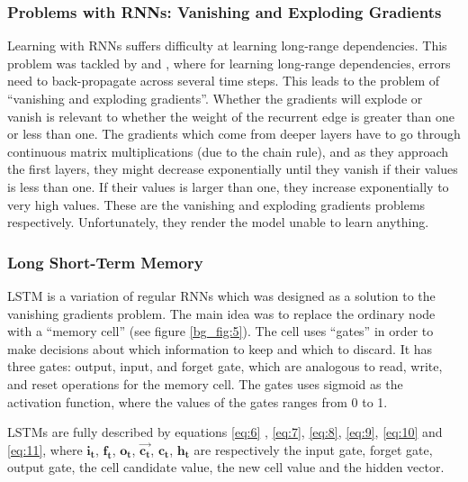 
\subsubsection{Problems with \ac{RNN}s: Vanishing and Exploding Gradients}
\label{bg:s2_sub2_subsub2}

Learning with \ac{RNN}s suffers difficulty at learning long-range dependencies. This problem was tackled by \cite{bengio1994learning} and \cite{hochreiter2001gradient}, where for learning long-range dependencies, errors need to back-propagate across several time steps. This leads to the problem of \enquote{vanishing and exploding gradients}. Whether the gradients will explode or vanish is relevant to whether the weight of the recurrent edge is greater than one or less than one. The gradients which come from deeper layers have to go through continuous matrix multiplications (due to the chain rule), and as they approach the first layers, they might decrease exponentially until they vanish if their values is less than one. If their values is larger than one, they increase exponentially to very high values. These are the vanishing and exploding gradients problems respectively. Unfortunately, they render the model unable to learn anything.


\subsubsection{Long Short-Term Memory}
\label{bg:s2_sub2_subsub3}

\ac{LSTM} \cite{hochreiter1997long} is a variation of regular \ac{RNN}s which was designed as a solution to the vanishing gradients problem. The main idea was to replace the ordinary node with a \enquote{memory cell} (see figure \ref{bg_fig:5}). The cell uses \enquote{gates} in order to make decisions about which information to keep and which to discard. It has three gates: output, input, and forget gate, which are analogous to read, write, and reset operations for the memory cell. The gates uses sigmoid as the activation function, where the values of the gates ranges from 0 to 1.

\ac{LSTM}s are fully described by equations \ref{eq:6} , \ref{eq:7}, \ref{eq:8}, \ref{eq:9}, \ref{eq:10} and \ref{eq:11}, where $\mathbf{i_t}$, $\mathbf{f_t}$, $\mathbf{o_t}$, $\mathbf{\vec{c_t}}$, $\mathbf{c_t}$, $\mathbf{h_t}$ are respectively the input gate, forget gate, output gate, the cell candidate value, the new cell value and the hidden vector. 


